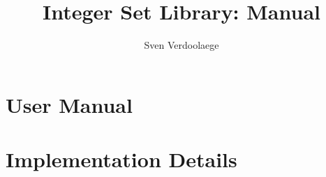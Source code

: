 \documentclass{report}
\numberwithin{theorem}{section}
\numberwithin{def}{section}
\numberwithin{example}{section}
\begin{document}
\title{Integer Set Library: Manual}
\author{Sven Verdoolaege}

\maketitle
\tableofcontents

\chapter{User Manual}



\chapter{Implementation Details}





\end{document}
